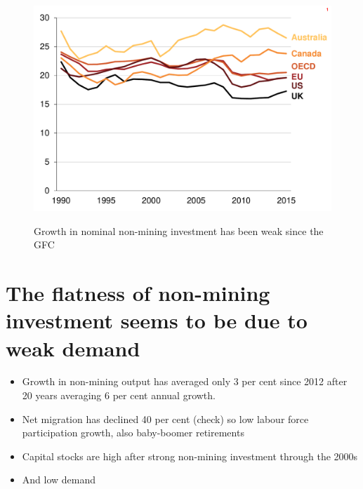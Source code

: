 \begin{figure}[p] 
 \caption{Growth in nominal non-mining investment has been weak since the GFC}
 \includegraphics[page=5]{atlas/Ch2.pdf}\label{fig:growcap}

\end{figure}

\section{The flatness of non-mining investment seems to be due to weak demand}

\begin{itemize}
    \item Growth in non-mining output has averaged only 3 per cent since 2012 after 20 years averaging 6 per cent annual growth.
    \item Net migration has declined 40 per cent (check) so low labour force participation growth, also baby-boomer retirements
    \item Capital stocks are high after strong non-mining investment through the 2000s
    \item And low demand
\end{itemize}

